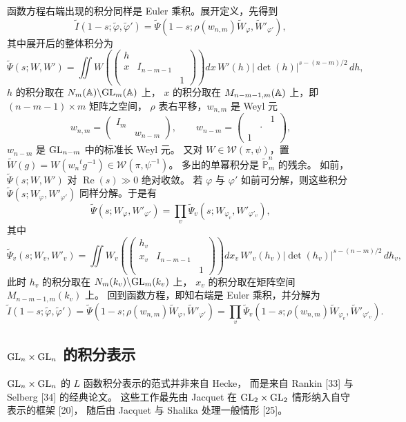 函数方程右端出现的积分同样是 Euler 乘积。展开定义，先得到
\[
\widetilde{I}(1-s;\widetilde{\varphi},\widetilde{\varphi}')
=\widetilde{\Psi}(1-s;\rho(w_{n,m})\widetilde{W}_\varphi,\widetilde{W}'_{\varphi'}),
\]
其中展开后的整体积分为
\[
\widetilde{\Psi}(s;W,W')=\iint W\left(\begin{pmatrix}h\\x&I_{n-m-1}\\&&1\end{pmatrix}\right)
dx\,W'(h)|\det(h)|^{s-(n-m)/2}\,dh,
\]
$h$ 的积分取在 $N_m(\mathbb{A})\backslash\mathrm{GL}_m(\mathbb{A})$ 上，
$x$ 的积分取在 $M_{n-m-1,m}(\mathbb{A})$ 上，即 $(n-m-1)\times m$ 矩阵之空间，
$\rho$ 表右平移，$w_{n,m}$ 是 Weyl 元
\[
w_{n,m}=\begin{pmatrix}I_m&\\&w_{n-m}\end{pmatrix},
\qquad
w_{n-m}=\begin{pmatrix}&&1\\&\cdot&\\1&&\end{pmatrix},
\]
$w_{n-m}$ 是 $\mathrm{GL}_{n-m}$ 中的标准长 Weyl 元。
又对 $W\in\mathcal{W}(\pi,\psi)$，置
$\widetilde{W}(g)=W(w_n{}^tg^{-1})\in\mathcal{W}(\pi,\psi^{-1})$。
多出的单幂积分是 $\widetilde{\mathbb{P}}^n_m$ 的残余。
如前，$\widetilde{\Psi}(s;W,W')$ 对 $\operatorname{Re}(s)\gg0$ 绝对收敛。
若 $\varphi$ 与 $\varphi'$ 如前可分解，则这些积分 $\widetilde{\Psi}(s;W_\varphi,W'_{\varphi'})$
同样分解。于是有
\[
\widetilde{\Psi}(s;W_\varphi,W'_{\varphi'})
=\prod_v\widetilde{\Psi}_v(s;W_{\varphi_v},W'_{\varphi'_v}),
\]
其中
\[
\widetilde{\Psi}_v(s;W_v,W'_v)=\iint W_v\left(\begin{pmatrix}h_v\\x_v&I_{n-m-1}\\&&1\end{pmatrix}\right)
dx_v\,W'_v(h_v)|\det(h_v)|^{s-(n-m)/2}\,dh_v,
\]
此时 $h_v$ 的积分取在 $N_m(k_v)\backslash\mathrm{GL}_m(k_v)$ 上，
$x_v$ 的积分取在矩阵空间 $M_{n-m-1,m}(k_v)$ 上。
回到函数方程，即知右端是 Euler 乘积，并分解为
\[
\widetilde{I}(1-s;\widetilde{\varphi},\widetilde{\varphi}')
=\widetilde{\Psi}(1-s;\rho(w_{n,m})\widetilde{W}_\varphi,\widetilde{W}'_{\varphi'})
=\prod_v\widetilde{\Psi}_v(1-s;\rho(w_{n,m})\widetilde{W}_{\varphi_v},\widetilde{W}'_{\varphi'_v}).
\]

\subsection{$\mathrm{GL}_n\times\mathrm{GL}_n$ 的积分表示}

$\mathrm{GL}_n\times\mathrm{GL}_n$ 的 $L$ 函数积分表示的范式并非来自 Hecke，
而是来自 Rankin [33] 与 Selberg [34] 的经典论文。
这些工作最先由 Jacquet 在 $\mathrm{GL}_2\times\mathrm{GL}_2$ 情形纳入自守表示的框架 [20]，
随后由 Jacquet 与 Shalika 处理一般情形 [25]。

